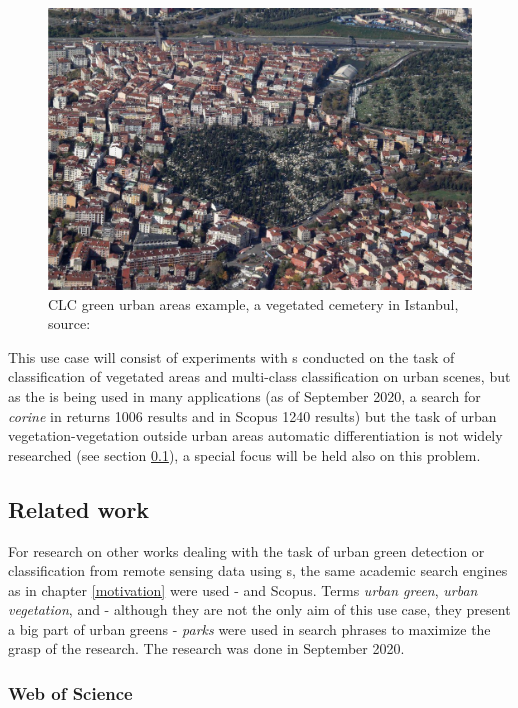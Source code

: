 \begin{figure}[h]
   \centering
	\includegraphics[width=0.6\linewidth]{./pictures/urban-vegetation-clc-02.png}
	\caption[CLC green urban areas example, vegetated cemetery]{CLC green urban areas example, a vegetated cemetery in Istanbul, source: \cite{clc-nomenclature}}
      \label{fig-urban-green-2}
\end{figure}

This use case will consist of experiments with s conducted on the task of classification of vegetated areas and multi-class classification on urban scenes, but as the  is being used in many applications (as of September 2020, a search for \textit{corine} in  returns 1006 results and in Scopus 1240 results) but the task of urban vegetation-vegetation outside urban areas automatic differentiation is not widely researched (see section \ref{urban-green-situation}), a special focus will be held also on this problem.

\subsection{Related work}
\label{urban-green-situation}

For research on other works dealing with the task of urban green detection or classification from remote sensing data using s, the same academic search engines as in chapter \ref{motivation} were used -  and Scopus. Terms \textit{urban green}, \textit{urban vegetation}, and - although they are not the only aim of this use case, they present a big part of urban greens - \textit{parks} were used in search phrases to maximize the grasp of the research. The research was done in September 2020.

\subsubsection{Web of Science}
\label{urban-green-wos}

